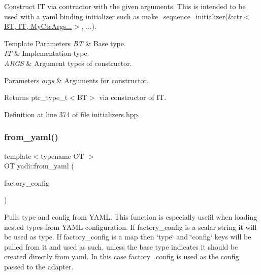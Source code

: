 Construct IT via contructor with the given arguments. This is intended to be used with a yaml binding initializer such as make\+\_\+sequence\+\_\+initializer(\&\hyperlink{namespaceyadi_a82056df230021b8fc8be27978644629d}{ctr$<$\+B\+T, I\+T, My\+Ctr\+Args...$>$}, ...). 


\begin{DoxyTemplParams}{Template Parameters}
{\em BT} & Base type. \\
\hline
{\em IT} & Implementation type. \\
\hline
{\em A\+R\+GS} & Argument types of constructor. \\
\hline
\end{DoxyTemplParams}

\begin{DoxyParams}{Parameters}
{\em args} & Arguments for constructor. \\
\hline
\end{DoxyParams}
\begin{DoxyReturn}{Returns}
ptr\+\_\+type\+\_\+t$<$\+B\+T$>$ via constructor of IT. 
\end{DoxyReturn}


Definition at line 374 of file initializers.\+hpp.

\mbox{\label{namespaceyadi_a85138aa0433192beaf4d0e67dd50cb23}} 
\subsubsection{\texorpdfstring{from\+\_\+yaml()}{from\_yaml()}}
{\footnotesize\ttfamily template$<$typename OT $>$ \\
OT yadi\+::from\+\_\+yaml (\begin{DoxyParamCaption}\item[{Y\+A\+M\+L\+::\+Node const \&}]{factory\+\_\+config }\end{DoxyParamCaption})}



Pulls type and config from Y\+A\+ML. This function is especially usefil when loading nested types from Y\+A\+ML configuration. If factory\+\_\+config is a scalar string it will be used as type. If factory\+\_\+config is a map then \char`\"{}type\char`\"{} and \char`\"{}config\char`\"{} keys will be pulled from it and used as such, unless the base type indicates it should be created directly from yaml. In this case factory\+\_\+config is used as the config passed to the adapter. 


